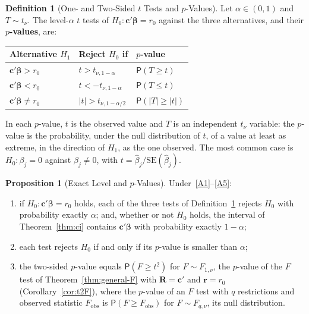 \documentclass[12pt,a4paper]{article}
\theoremstyle{definition}
\newtheorem{definition}[theorem]{Definition}
\newtheorem{proposition}[theorem]{Proposition}
\newcommand\prb{\mathsf{P}}
\newcommand{\SE}{\mathrm{SE}}
\def\bb{\boldsymbol{\beta}}
\newcommand{\bR}{\mathbf{R}}
\newcommand{\br}{\mathbf{r}}
\def\bc{\mathbf{c}}
\begin{document}
\begin{definition}[One- and Two-Sided $t$ Tests and $p$-Values]\label{def:t-tests}
Let $\alpha \in (0, 1)$ and $T \sim t_\nu$. The level-$\alpha$ $t$ tests of $H_0\colon \bc'\bb = r_0$ against the three alternatives, and their \textbf{$p$-values}, are:
\begin{center}
\begin{tabular}{@{}lll@{}}
\toprule
Alternative $H_1$ & Reject $H_0$ if & $p$-value\\
\midrule
$\bc'\bb > r_0$ & $t > t_{\nu,1-\alpha}$ & $\prb(T \geqslant t)$\\
$\bc'\bb < r_0$ & $t < -t_{\nu,1-\alpha}$ & $\prb(T \leqslant t)$\\
$\bc'\bb \neq r_0$ & $|t| > t_{\nu,1-\alpha/2}$ & $\prb(|T| \geqslant |t|)$\\
\bottomrule
\end{tabular}
\end{center}
In each $p$-value, $t$ is the observed value and $T$ is an independent $t_\nu$ variable: the $p$-value is the probability, under the null distribution of $t$, of a value at least as extreme, in the direction of $H_1$, as the one observed. The most common case is $H_0\colon \beta_j = 0$ against $\beta_j \neq 0$, with $t = \hat\beta_j/\SE(\hat\beta_j)$.
\end{definition}

\begin{proposition}[Exact Level and $p$-Values]\label{prop:t-pvalue}
Under~\ref{A1}--\ref{A5}:
\begin{enumerate}[label=\textup{(\roman*)}]
\item if $H_0\colon \bc'\bb = r_0$ holds, each of the three tests of Definition~\ref{def:t-tests} rejects $H_0$ with probability exactly $\alpha$; and, whether or not $H_0$ holds, the interval of Theorem~\ref{thm:ci} contains $\bc'\bb$ with probability exactly $1 - \alpha$;
\item each test rejects $H_0$ if and only if its $p$-value is smaller than $\alpha$;
\item the two-sided $p$-value equals $\prb(F \geqslant t^2)$ for $F \sim F_{1,\nu}$, the $p$-value of the $F$ test of Theorem~\ref{thm:general-F} with $\bR = \bc'$ and $\br = r_0$ (Corollary~\ref{cor:t2F}), where the $p$-value of an $F$ test with $q$ restrictions and observed statistic $F_{\mathrm{obs}}$ is $\prb(F \geqslant F_{\mathrm{obs}})$ for $F \sim F_{q,\nu}$, its null distribution.
\end{enumerate}
\end{proposition}
\end{document}
